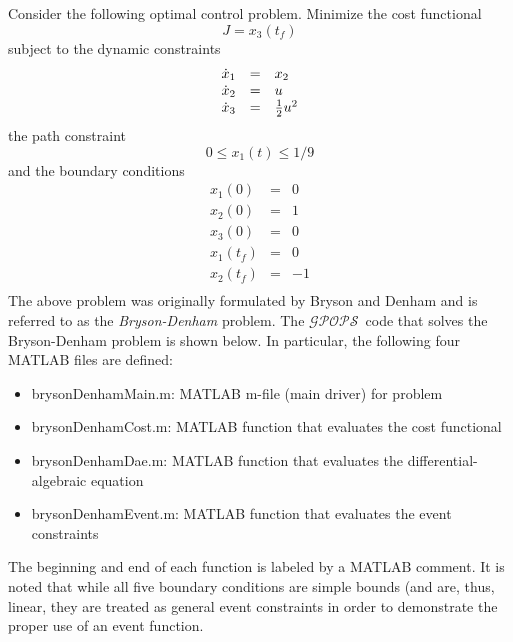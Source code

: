 \documentclass[10pt,final]{report}
\newcommand{\gpops}{$\mathcal{GPOPS}$~}
\newcounter{example}[chapter]
\newenvironment{shadedframe}{%
  \def\FrameCommand{\fcolorbox{black}{shadecolor}}%
  \MakeFramed {\FrameRestore}}
{\endMakeFramed}
\begin{document}
Consider the following optimal control problem.  Minimize the cost functional
\begin{equation}
  J = x_3(t_f)
\end{equation}
subject to the dynamic constraints
\begin{equation}
  \begin{array}{lcl}
    \dot{x}_1 & = & x_2 \\
    \dot{x}_2 & = & u \\
    \dot{x}_3 & = & \frac{1}{2}u^2
  \end{array}
\end{equation}
the path constraint
\begin{equation}
  0 \leq x_1(t) \leq 1/9
\end{equation}
and the boundary conditions
\begin{equation}
  \begin{array}{lcl}
    x_1(0) & = & 0 \\
    x_2(0) & = & 1 \\
    x_3(0) & = & 0 \\
    x_1(t_f) & = & 0 \\
    x_2(t_f) & = & -1 \\
  \end{array}
\end{equation}
The above problem was originally formulated by Bryson and Denham \cite{Bryson2} and is referred to as the {\em Bryson-Denham} problem.  The
\gpops code that solves the Bryson-Denham problem is shown below.  In
particular, the following four MATLAB files are defined:
\begin{itemize}
  \item brysonDenhamMain.m: MATLAB m-file (main driver) for problem
  \item brysonDenhamCost.m: MATLAB function that evaluates the cost functional
  \item brysonDenhamDae.m: MATLAB function that evaluates the differential-algebraic equation
  \item brysonDenhamEvent.m: MATLAB function that evaluates the event constraints
\end{itemize}
The beginning and end of each function is labeled by a MATLAB
comment. It is noted that while all five boundary conditions are
simple bounds (and are, thus, linear, they are treated as general
event constraints in order to demonstrate the proper use of an event
function.
\footnotesize
\begin{shadedframe}



\end{shadedframe}
\end{document}
